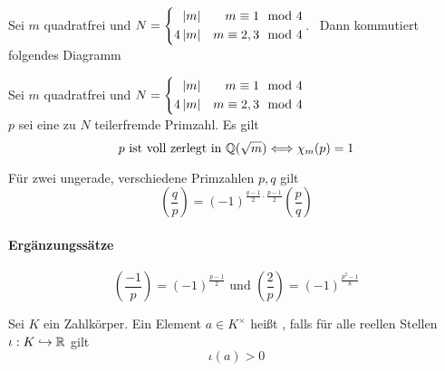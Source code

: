 \documentclass{book}
\newcommand{\Leg}[2]{\left(\frac{#1}{#2}\right)}
\begin{document}
\Satz{}
Sei $m$ quadratfrei und $N = 
\left\lbrace\begin{aligned}
\left|m\right| && m \equiv 1 \mod{4}\\
4\left|m\right| && m \equiv 2,3 \mod{4}
\end{aligned}\right.$. \ Dann kommutiert folgendes Diagramm
\begin{center}
\end{center}

\Satz{}
Sei $m$ quadratfrei und $N = 
\left\lbrace\begin{aligned}
\left|m\right| && m \equiv 1 \mod{4}\\
4\left|m\right| && m \equiv 2,3 \mod{4}
\end{aligned}\right.$\\
$p$ sei eine zu $N$ teilerfremde Primzahl. Es gilt
\[ p \text{ ist voll zerlegt in } \mathbb{Q}(\sqrt{m}) \overset{}{\Longleftrightarrow} \chi_m(p) = 1 \]

Für zwei ungerade, verschiedene Primzahlen $p,q$ gilt
\[ \Leg{q}{p} = (-1)^{\frac{q-1}{2} \cdot \frac{p-1}{2} } \Leg{p}{q} \]

\paragraph{Ergänzungssätze}
\[ \Leg{-1}{p} = (-1)^{\frac{p-1}{2}} \text{ und } \Leg{2}{p} = (-1)^{\frac{p^2-1}{8}} \]

\Def{}
Sei $K$ ein Zahlkörper. Ein Element $a \in K^\times$ heißt , falls für alle reellen Stellen $\iota : K \overset{}{\hookrightarrow} \mathbb{R}$ gilt
\[ \iota(a) > 0 \]
\end{document}
